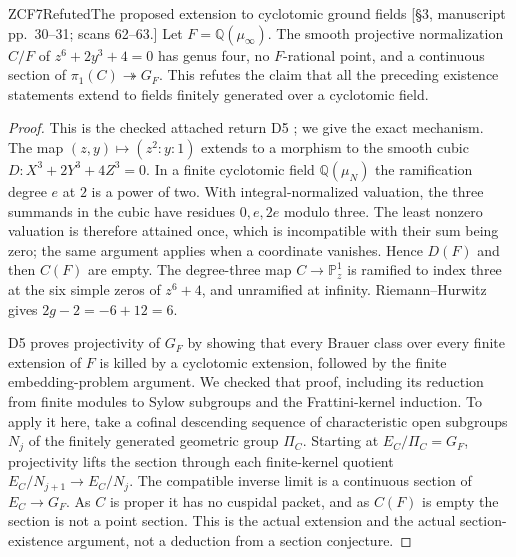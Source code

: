 \begin{result}{ZCF7}{Refuted}{The proposed extension to cyclotomic ground fields}
\textup{[\S3, manuscript pp.\ 30--31; scans 62--63.]}
Let $F=\mathbb Q(\mu_\infty)$. The smooth projective normalization
$C/F$ of $z^6+2y^3+4=0$ has genus four, no $F$-rational point,
and a continuous section of $\pi_1(C)\twoheadrightarrow G_F$.
This refutes the claim that all the preceding existence statements
extend to fields finitely generated over a cyclotomic field.
\end{result}
\begin{proof}
This is the checked attached return D5 \cite{PriorCyclotomic}; we give the exact mechanism.
The map $(z,y)\mapsto(z^2:y:1)$ extends to a morphism to the
smooth cubic $D:X^3+2Y^3+4Z^3=0$. In a finite cyclotomic field
$\mathbb Q(\mu_N)$ the ramification degree $e$ at $2$ is a power
of two. With integral-normalized valuation, the three summands in
the cubic have residues $0,e,2e$ modulo three. The least nonzero
valuation is therefore attained once, which is incompatible with
their sum being zero; the same argument applies when a coordinate
vanishes. Hence $D(F)$ and then $C(F)$ are empty.
The degree-three map $C\to\mathbb P^1_z$ is ramified to index
three at the six simple zeros of $z^6+4$, and unramified at infinity.
Riemann--Hurwitz gives $2g-2=-6+12=6$.

D5 proves projectivity of $G_F$ by showing that every Brauer class
over every finite extension of $F$ is killed by a cyclotomic
extension, followed by the finite embedding-problem argument.
We checked that proof, including its reduction from finite modules
to Sylow subgroups and the Frattini-kernel induction. To apply it
here, take a cofinal descending sequence of characteristic open
subgroups $N_j$ of the finitely generated geometric group $\Pi_C$.
Starting at $E_C/\Pi_C=G_F$, projectivity lifts the section through
each finite-kernel quotient $E_C/N_{j+1}\to E_C/N_j$. The
compatible inverse limit is a continuous section of $E_C\to G_F$.
As $C$ is proper it has no cuspidal packet, and as $C(F)$ is empty
the section is not a point section. This is the actual extension
and the actual section-existence argument, not a deduction from a
section conjecture.
\end{proof}

